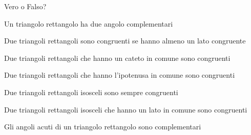 \begin{esercizio}
\label{ese:3.46}
Vero o Falso?
\begin{enumeratea}
\item Un triangolo rettangolo ha due angolo complementari\hfill\boxV\quad\boxF
\item Due triangoli rettangoli sono congruenti se hanno almeno un lato congruente\hfill\boxV\quad\boxF
\item Due triangoli rettangoli che hanno un cateto in comune sono congruenti\hfill\boxV\quad\boxF
\item Due triangoli rettangoli che hanno l'ipotenusa in comune sono congruenti\hfill\boxV\quad\boxF
\item Due triangoli rettangoli isosceli sono sempre congruenti\hfill\boxV\quad\boxF
\item Due triangoli rettangoli isosceli che hanno un lato in comune sono congruenti\hfill\boxV\quad\boxF
\item Gli angoli acuti di un triangolo rettangolo sono complementari\hfill\boxV\quad\boxF
\end{enumeratea}
\end{esercizio}

